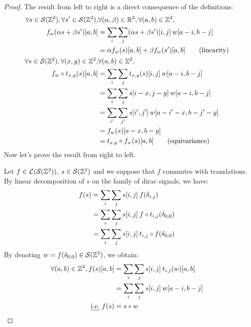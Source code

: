 \begin{proof}
The result from left to right is a direct consequence of the definitions:
\begin{align}
\forall s \in \cs(\bbz^2), \forall s' \in \cs(\bbz^2), & \forall (\alpha, \beta) \in \bbr^2,\forall (a,b) \in \bbz^2,\nonumber\\
 f_w(\alpha s + \beta s')[a,b] & = \displaystyle \sum_i \sum_j (\alpha s + \beta s')[i,j] \h{2} w[a-i, b-j]\nonumber\\
 & = \alpha f_w(s)[a,b] + \beta f_w(s')[a,b] \tag{linearity}\\
\forall s \in \cs(\bbz^2), \forall (x, y) \in \bbz^2, & \forall (a,b) \in \bbz^2,\nonumber\\
f_w \circ t_{x,y} (s)[a,b] & = \displaystyle \sum_i \sum_j t_{x,y}(s)[i,j] \h{2} w[a-i, b-j]\nonumber\\
 & = \displaystyle \sum_i \sum_j s[i - x,j - y] \h{2} w[a-i, b-j]\nonumber\\
 & = \displaystyle \sum_{i'} \sum_{j'} s[i',j'] \h{2} w[a - i' - x, b - j'- y]\label{eq:bij}\\
 & = f_w (s)[a - x,b - y]\nonumber\\
 & = t_{x,y} \circ f_w (s)[a,b] \tag{equivariance}
\end{align}
Now let's prove the result from right to left.

Let $f \in \cl(\cs(\bbz^2))$, $s \in \cs(\bbz^2)$ and we suppose that $f$ commutes with translations. By linear decomposition of $s$ on the family of dirac signals, we have:
\begin{align*}
f(s) & = \displaystyle \sum_i \sum_j s[i,j] \h{2} f(\delta_{i,j})\\
 & = \displaystyle \sum_i \sum_j s[i,j] \h{2} f \circ t_{i,j} (\delta_{0,0})\\
 & = \displaystyle \sum_i \sum_j s[i,j] \h{2} t_{i,j} \circ f (\delta_{0,0})
\end{align*}
By denoting $w = f (\delta_{0,0}) \in \cs(\bbz^2)$, we obtain:
\begin{align}
\forall (a,b) \in \bbz^2, f(s)[a,b] & = \displaystyle \sum_i \sum_j s[i,j] \h{2} t_{i,j}(w)[a,b] \label{eq:conv}\\
 & = \displaystyle \sum_i \sum_j s[i,j] \h{2} w[a-i, b-j] \nonumber\\
\text{\ie } f(s) & = s \ast w \nonumber
\end{align}
\end{proof}

